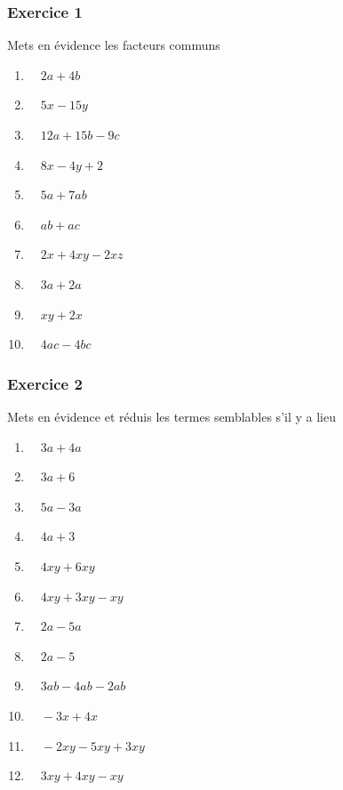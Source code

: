 \documentclass[
  12pt,
]{book}
\providecommand{\tightlist}{%
  \setlength{\itemsep}{0pt}\setlength{\parskip}{0pt}}
\begin{document}
\hypertarget{exercice-1-3}{%
\subsubsection*{Exercice 1}\label{exercice-1-3}}

Mets en évidence les facteurs communs

\begin{enumerate}
\def\labelenumi{\arabic{enumi}.}
\tightlist
\item
  \(\quad 2a+4b\)
\item
  \(\quad 5x-15y\)
\item
  \(\quad 12a+15b-9c\)
\item
  \(\quad 8x -4y +2\)
\item
  \(\quad 5a + 7ab\)
\item
  \(\quad ab+ac\)
\item
  \(\quad 2x+4xy-2xz\)
\item
  \(\quad 3a+2a\)
\item
  \(\quad xy+2x\)
\item
  \(\quad 4ac-4bc\)
\end{enumerate}

\hypertarget{exercice-2-2}{%
\subsubsection*{Exercice 2}\label{exercice-2-2}}

Mets en évidence et réduis les termes semblables s'il y a lieu

\begin{enumerate}
\def\labelenumi{\arabic{enumi}.}
\tightlist
\item
  \(\quad 3a+4a\)
\item
  \(\quad 3a+6\)
\item
  \(\quad 5a-3a\)
\item
  \(\quad 4a+3\)
\item
  \(\quad 4xy+6xy\)
\item
  \(\quad 4xy+3xy-xy\)
\item
  \(\quad 2a-5a\)
\item
  \(\quad 2a-5\)
\item
  \(\quad 3ab-4ab-2ab\)
\item
  \(\quad -3x+4x\)
\item
  \(\quad -2xy-5xy+3xy\)
\item
  \(\quad 3xy+4xy-xy\)
\end{enumerate}
\end{document}
